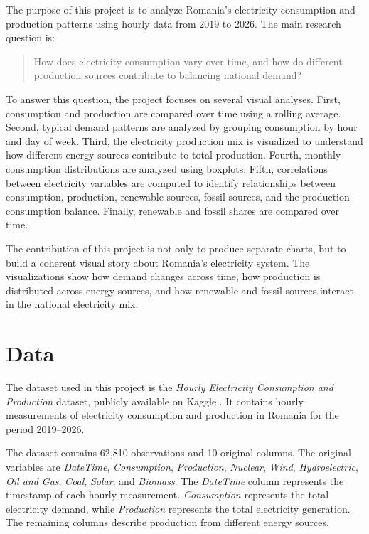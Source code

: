 \documentclass[conference]{IEEEtran}
\begin{document}
The purpose of this project is to analyze Romania's electricity consumption and production patterns using hourly data from 2019 to 2026. The main research question is:

\begin{quote}
How does electricity consumption vary over time, and how do different production sources contribute to balancing national demand?
\end{quote}

To answer this question, the project focuses on several visual analyses. First, consumption and production are compared over time using a rolling average. Second, typical demand patterns are analyzed by grouping consumption by hour and day of week. Third, the electricity production mix is visualized to understand how different energy sources contribute to total production. Fourth, monthly consumption distributions are analyzed using boxplots. Fifth, correlations between electricity variables are computed to identify relationships between consumption, production, renewable sources, fossil sources, and the production-consumption balance. Finally, renewable and fossil shares are compared over time.

The contribution of this project is not only to produce separate charts, but to build a coherent visual story about Romania's electricity system. The visualizations show how demand changes across time, how production is distributed across energy sources, and how renewable and fossil sources interact in the national electricity mix.

\section{Data}

The dataset used in this project is the \textit{Hourly Electricity Consumption and Production} dataset, publicly available on Kaggle \cite{kaggle_electricity}. It contains hourly measurements of electricity consumption and production in Romania for the period 2019--2026.

The dataset contains 62,810 observations and 10 original columns. The original variables are \textit{DateTime}, \textit{Consumption}, \textit{Production}, \textit{Nuclear}, \textit{Wind}, \textit{Hydroelectric}, \textit{Oil and Gas}, \textit{Coal}, \textit{Solar}, and \textit{Biomass}. The \textit{DateTime} column represents the timestamp of each hourly measurement. \textit{Consumption} represents the total electricity demand, while \textit{Production} represents the total electricity generation. The remaining columns describe production from different energy sources.
\end{document}
